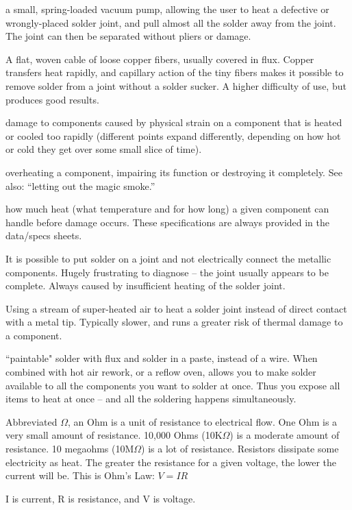 \documentclass[12pt]{article}
\begin{document}
\begin{description}
 a small, spring-loaded vacuum pump, allowing the user to heat a defective or wrongly-placed solder joint, and pull almost all the solder away from the joint. The joint can then be separated without pliers or damage.

 A flat, woven cable of loose copper fibers, usually covered in flux. Copper transfers heat rapidly, and capillary action of the tiny fibers makes it possible to remove solder from a joint without a solder sucker. A higher difficulty of use, but produces good results.

 damage to components caused by physical strain on a component that is heated or cooled too rapidly (different points expand differently, depending on how hot or cold they get over some small slice of time).

 overheating a component, impairing its function or destroying it completely. See also: ``letting out the magic smoke.''

 how much heat (what temperature and for how long) a given component can handle before damage occurs. These specifications are always provided in the data/specs sheets.

 It is possible to put solder on a joint and not electrically connect the metallic components. Hugely frustrating to diagnose -- the joint usually appears to be complete. Always caused by insufficient heating of the solder joint. 

 Using a stream of super-heated air to heat a solder joint instead of direct contact with a metal tip. Typically slower, and runs a greater risk of thermal damage to a component.

 ``paintable" solder with flux and solder in a paste, instead of a wire. When combined with hot air rework, or a reflow oven, allows you to make solder available to all the components you want to solder at once. Thus you expose all items to heat at once -- and all the soldering happens simultaneously.

\+[Ohm:] Abbreviated $\Omega$, an Ohm is a unit of resistance to electrical flow. One Ohm is a very small amount of resistance. 10,000 Ohms (10K$\Omega$) is a moderate amount of resistance. 10 megaohms (10M$\Omega$) is a lot of resistance. Resistors dissipate some electricity as heat. The greater the resistance for a given voltage, the lower the current will be. This is Ohm's Law: $V=IR$ 

I is current, R is resistance, and V is voltage.

\end{description}
\end{document}
